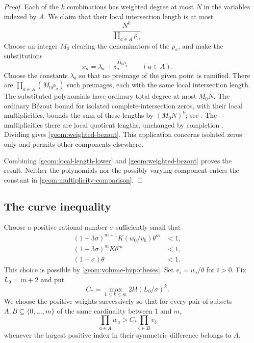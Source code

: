 \begin{proof}
Each of the $k$ combinations has weighted degree at most $N$ in the
variables indexed by $A$. We claim that their local intersection length
is at most
\begin{equation}
\label{geom:weighted-bezout}
 \frac{N^k}{\prod_{a\in A}\rho_a}.
\end{equation}
Choose an integer $M_0$ clearing the denominators of the $\rho_a$, and
make the substitutions
\[
 x_a=\lambda_a+z_a^{M_0\rho_a}\qquad(a\in A).
\]
Choose the constants $\lambda_a$ so that no preimage of the given point
is ramified. There are $\prod_{a\in A}(M_0\rho_a)$ such preimages, each
with the same local intersection length. The substituted polynomials
have ordinary total degree at most $M_0N$. The ordinary B\'ezout bound
for isolated complete-intersection zeros, with their local
multiplicities, bounds the sum of these lengths by $(M_0N)^k$;
see \cite[Corollary~VIII.3, p.~144]{mondal2021}.
The multiplicities there are local quotient lengths, unchanged by
completion \cite[Section~IV.4.2]{mondal2021}.
Dividing gives \eqref{geom:weighted-bezout}.
This application concerns isolated zeros only and permits other
components elsewhere.

Combining \eqref{geom:local-length-lower} and
\eqref{geom:weighted-bezout} proves the result. Neither the
polynomials nor the possibly varying component enters the constant in
\eqref{geom:multiplicity-comparison}.
\end{proof}

\subsection{The curve inequality}

Choose a positive rational number $\sigma$ sufficiently small that
\begin{equation}
\label{geom:sigma}
 \begin{split}
 (1+3\sigma)^{m+1}K(w_0/v_0)\theta^m&<1,\\
 (1+3\sigma)^mK\theta^m&<1,\\
 (1+\sigma)\theta&<1.
 \end{split}
\end{equation}
This choice is possible by \eqref{geom:volume-hypotheses}. Set $v_i=w_i/\theta$
for $i>0$. Fix $L_0=m+2$ and put
\begin{equation}
\label{geom:constant}
 C_* =\max_{1\le k\le m}2k!(L_0/\sigma)^k.
\end{equation}
We choose the positive weights successively so that for every pair of
subsets $A,B\subseteq\{0,\ldots,m\}$ of the same cardinality between
$1$ and $m$,
\begin{equation}
\label{geom:separation}
 \prod_{a\in A}w_a>C_*\prod_{b\in B}v_b
\end{equation}
whenever the largest positive index in their symmetric difference belongs
to $A$.

